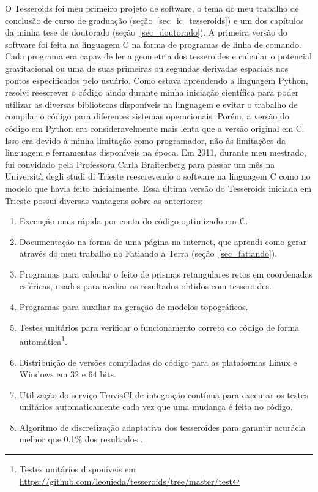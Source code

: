 \documentclass[12pt,a4paper,oneside]{book}
\newcommand{\Trieste}{Università degli studi di Trieste}
\begin{document}
O Tesseroids foi meu primeiro projeto de software, o tema do meu
trabalho de conclusão de curso de graduação (seção~\ref{sec_ic_tesseroids})
e um dos capítulos da minha tese de doutorado (seção~\ref{sec_doutorado}).
A primeira versão do software foi feita na linguagem C na forma de programas
de linha de comando.
Cada programa era capaz de ler a geometria dos tesseroides e calcular o
potencial gravitacional ou uma de suas primeiras ou segundas derivadas
espaciais nos pontos especificados pelo usuário.
Como estava aprendendo a linguagem Python, resolvi reescrever o código ainda
durante minha iniciação científica para poder utilizar as diversas bibliotecas
disponíveis na linguagem e evitar o trabalho de compilar o código para
diferentes sistemas operacionais.
Porém, a versão do código em Python era consideravelmente mais lenta que a
versão original em C.
Isso era devido à minha limitação como programador, não às limitações da
linguagem e ferramentas disponíveis na época.
Em 2011, durante meu mestrado, fui convidado pela Professora Carla Braitenberg
para passar um mês na \Trieste{} reescrevendo o software na linguagem C como no
modelo que havia feito inicialmente.
Essa última versão do Tesseroids iniciada em Trieste possui diversas vantagens
sobre as anteriores:

\begin{enumerate}
  \item Execução mais rápida por conta do código optimizado em C.
  \item Documentação na forma de uma página na internet, que aprendi como gerar
    através do meu trabalho no Fatiando a Terra (seção~\ref{sec_fatiando}).
  \item Programas para calcular o feito de prismas retangulares retos em
    coordenadas esféricas, usados para avaliar os resultados obtidos com
    tesseroides.
  \item Programas para auxiliar na geração de modelos topográficos.
  \item Testes unitários para verificar o funcionamento correto do código de
    forma automática\footnote{Testes unitários disponíveis em \url{https://github.com/leouieda/tesseroids/tree/master/test}}.
  \item Distribuição de versões compiladas do código para as plataformas Linux
    e Windows em 32 e 64 bits.
  \item Utilização do serviço \href{https://travis-ci.org/github/leouieda/tesseroids}{TravisCI} de
    \href{https://pt.wikipedia.org/wiki/Integra%C3%A7%C3%A3o_cont%C3%ADnua}{integração contínua}
    para executar os testes unitários automaticamente cada vez que uma mudança
    é feita no código.
  \item Algoritmo de discretização adaptativa dos tesseroides para garantir
    acurácia melhor que 0.1\% dos resultados \citep{Uieda2016}.
\end{enumerate}
\end{document}
